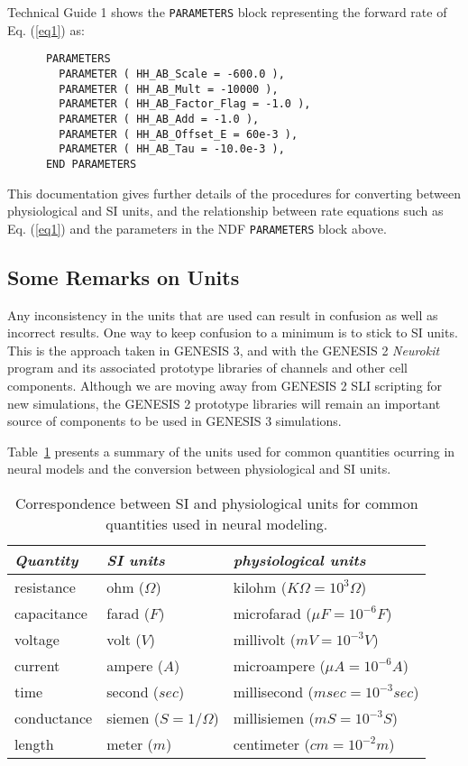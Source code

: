 \documentclass[12pt]{article}
\begin{document}
Technical Guide 1 shows the {\tt PARAMETERS} block representing the forward
rate of Eq. (\ref{eq1}) as:

\begin{verbatim}
      PARAMETERS
        PARAMETER ( HH_AB_Scale = -600.0 ),
        PARAMETER ( HH_AB_Mult = -10000 ),
        PARAMETER ( HH_AB_Factor_Flag = -1.0 ),
        PARAMETER ( HH_AB_Add = -1.0 ),
        PARAMETER ( HH_AB_Offset_E = 60e-3 ),
        PARAMETER ( HH_AB_Tau = -10.0e-3 ),
      END PARAMETERS
\end{verbatim}

This documentation gives further details of the procedures for converting
between physiological and SI units, and the relationship between rate equations
such as Eq. (\ref{eq1}) and the parameters in the NDF {\tt PARAMETERS}
block above.

\subsection{Some Remarks on Units}

Any inconsistency in the units that are used can result in confusion as
well as incorrect results.  One way to keep confusion to a minimum is to
stick to SI units.  This is the approach taken in GENESIS 3, and with the GENESIS 2
{\em Neurokit\/} program and its associated prototype libraries of channels
and other cell components.  Although we are moving away from GENESIS 2
SLI scripting for new simulations, the GENESIS 2 prototype libraries will
remain an important source of components to be used in GENESIS 3
simulations.

Table~\ref{tab1} presents a summary of
the units used for common quantities ocurring in neural models and
the conversion between physiological and SI units.

\begin{table}[thb]
\label{tab1}
\centering
\begin{tabular}{lll} \hline
{\em Quantity}   & {\em SI units}       & {\em physiological units} \\
\hline
  resistance   & ohm ($\Omega$)  & kilohm ($K\Omega = 10^3 \Omega$) \\
  capacitance  & farad ($F$)     & microfarad ($\mu F = 10^{-6} F$) \\
  voltage      & volt ($V$)      & millivolt ($mV = 10^{-3} V$) \\
  current      & ampere ($A$)    & microampere ($\mu A = 10^{-6} A$) \\
  time         & second ($sec$)  & millisecond ($msec = 10^{-3} sec$) \\
  conductance & siemen ($S = 1/\Omega$) & millisiemen ($mS = 10^{-3} S$) \\
  length       & meter ($m$)     & centimeter ($cm = 10^{-2} m$) \\
\hline
\end{tabular}
\caption{Correspondence between SI and physiological units for common
quantities used in neural modeling.}
\end{table}
\end{document}
